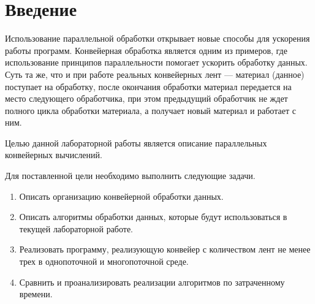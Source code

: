 \chapter*{Введение}

Использование параллельной обработки открывает новые способы для ускорения работы программ.
Конвейерная обработка является одним из примеров, где использование принципов параллельности помогает ускорить обработку данных. 
Суть та же, что и при работе реальных конвейерных лент --- материал (данное) поступает на обработку, после окончания обработки материал передается на место следующего обработчика, при этом предыдущий обработчик не ждет полного цикла обработки материала, а получает новый материал и работает с ним.

Целью данной лабораторной работы является описание параллельных конвейерных вычислений.

Для поставленной цели необходимо выполнить следующие задачи.
\begin{enumerate}
	\item Описать организацию конвейерной обработки данных.
	\item Описать алгоритмы обработки данных, которые будут использоваться в текущей лабораторной работе.
	\item Реализовать программу, реализующую конвейер с количеством лент не менее трех в однопоточной и многопоточной среде.
	\item Сравнить и проанализировать реализации алгоритмов по затраченному времени.
\end{enumerate}